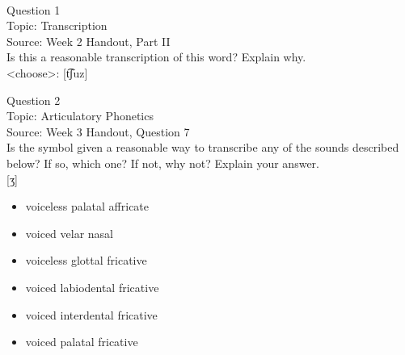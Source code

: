 \documentclass[12pt]{article}
\begin{document}
\newpage

\begin{center}
\textbf{{\color{red}{\HUGE END OF EXAM}}}\\

\end{center}
\newpage

\begin{center}
\textbf{{\color{blue}{\HUGE START OF EXAM\\}}}

\textbf{{\color{blue}{\HUGE Student ID: 51967\\}}}

\textbf{{\color{blue}{\HUGE \\}}}

\end{center}
\newpage

{\large Question 1}\\

Topic: Transcription\\
Source: Week 2 Handout, Part II\\

Is this a reasonable transcription of this word? Explain why.\\

<choose>: {[t͡ʃuz]}


\newpage

{\large Question 2}\\

Topic: Articulatory Phonetics\\
Source: Week 3 Handout, Question 7\\

Is the symbol given a reasonable way to transcribe any of the sounds described below? If so, which one? If not, why not? Explain your answer.\\

{[ʒ]}

\begin{itemize} \item voiceless palatal affricate \item voiced velar nasal \item voiceless glottal fricative \item voiced labiodental fricative \item voiced interdental fricative \item voiced palatal fricative \end{itemize}


\newpage
\end{document}

